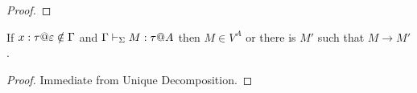 \begin{proof}

    \end{proof}

\begin{corollary}[Progress]
    If $x:\tau@\varepsilon \notin \G$ and $\Gamma \vdash_\Sigma M : \tau @ A$ then $ M \in V^A $ or there is $M'$ such that $M \longrightarrow M'$.
\end{corollary}

\begin{proof}
    Immediate from Unique Decomposition.
\end{proof}
